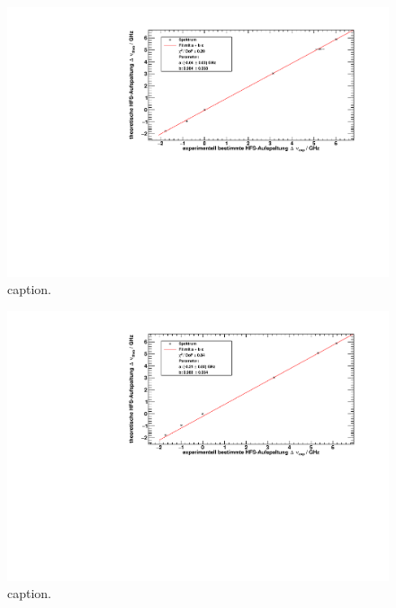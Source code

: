 \begin{figure}[H]
\begin{center}
  \includegraphics[width=\textwidth]{../img/part2/up-spectrum.pdf}
  \caption{caption.}
  \label{img:hfs:spectrum:up}
\end{center}
\end{figure}

\begin{figure}[H]
\begin{center}
  \includegraphics[width=\textwidth]{../img/part2/down-spectrum.pdf}
  \caption{caption.}
  \label{img:hfs:spectrum:down}
\end{center}
\end{figure}
